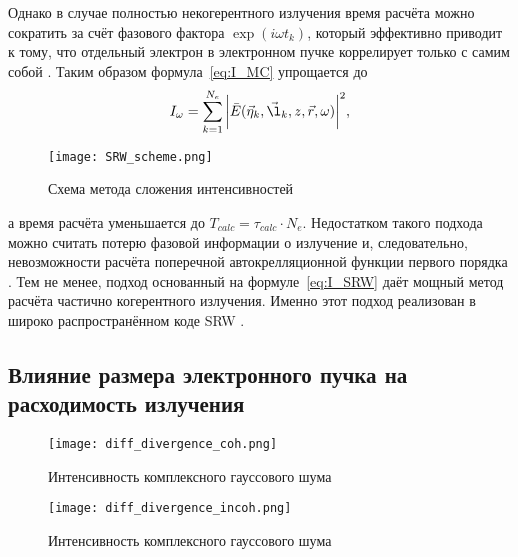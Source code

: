 Однако в случае полностью некогерентного излучения время расчёта можно сократить за счёт фазового фактора $\exp{(i \omega t_k)}$, который эффективно приводит к тому, что отдельный электрон в электронном пучке коррелирует только с самим собой \cite{geloni_transverse_2008}. Таким образом формула~\ref{eq:I_MC} упрощается до 
\begin{align}
 	I_{\omega} = \sum\limits_{k=1}^{N_e} \bigg|\bar{E}(\vec{\eta}_k, \vec{\l}_k, z, \vec{r}, \omega)\bigg|^2,
 	\label{eq:I_SRW} 
\end{align}
\begin{figure}[H] 
	\centering 	\texttt{[image: SRW\_scheme.png]}
	\caption{Схема метода сложения интенсивностей }
	\label{fig:SRW_scheme}
\end{figure}
\noindent а время расчёта уменьшается до $T_{calc} = \tau_{calc} \cdot N_e$. Недостатком такого подхода можно считать потерю фазовой информации о излучение и, следовательно, невозможности расчёта поперечной автокрелляционной функции первого порядка . Тем не менее, подход основанный на формуле~\ref{eq:I_SRW} даёт мощный метод расчёта частично когерентного излучения. Именно этот подход реализован в широко распространённом коде SRW .
 
\subsection{Влияние размера электронного пучка на расходимость излучения}

\begin{figure}[H] 
	\centering 	\texttt{[image: diff\_divergence\_coh.png]}
	\caption{Интенсивность комплексного гауссового шума}
	\label{fig:diff_coh_incoh_rad}
\end{figure}

\begin{figure}[H] 
	\centering 	\texttt{[image: diff\_divergence\_incoh.png]}
	\caption{Интенсивность комплексного гауссового шума}
	\label{fig:diff_coh_incoh_rad}
\end{figure}

